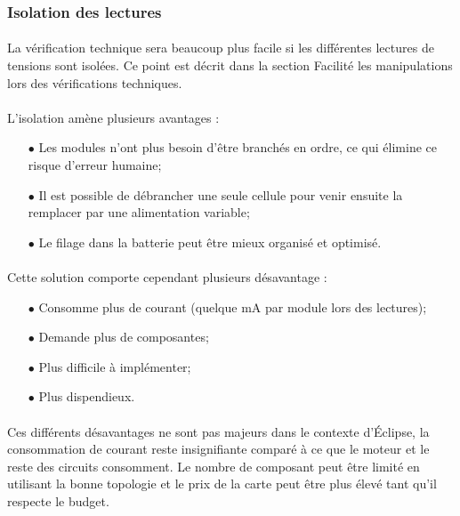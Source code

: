 	\newpage
	
	\subsubsection*{Isolation des lectures}
	\paragraph*{}
	La vérification technique sera beaucoup plus facile si les différentes lectures de tensions sont isolées. Ce point est décrit dans la section Facilité les manipulations lors des vérifications techniques. 
	
	\paragraph*{}
	L'isolation amène plusieurs avantages :
	
	\begin{itemize}
		\item[$\bullet$] Les modules n'ont plus besoin d'être branchés en ordre, ce qui élimine ce risque d'erreur humaine;
		\item[$\bullet$] Il est possible de débrancher une seule cellule pour venir ensuite la remplacer par une alimentation variable;
		\item[$\bullet$] Le filage dans la batterie peut être mieux organisé et optimisé.
	\end{itemize}

	\paragraph*{}
	Cette solution comporte cependant plusieurs désavantage :
	
	\begin{itemize}
		\item[$\bullet$] Consomme plus de courant (quelque mA par module lors des lectures);
		\item[$\bullet$] Demande plus de composantes;
		\item[$\bullet$] Plus difficile à implémenter;
		\item[$\bullet$] Plus dispendieux.
	\end{itemize}
	
	\paragraph*{}
	Ces différents désavantages ne sont pas majeurs dans le contexte d'Éclipse, la consommation de courant reste insignifiante comparé à ce que le moteur et le reste des circuits consomment. Le nombre de composant peut être limité en utilisant la bonne topologie et le prix de la carte peut être plus élevé tant qu'il respecte le budget. 
	
